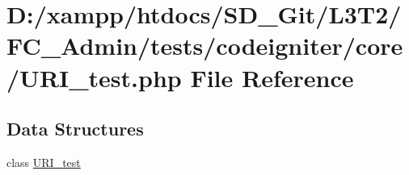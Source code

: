 \hypertarget{_admin_2tests_2codeigniter_2core_2_u_r_i__test_8php}{}\section{D\+:/xampp/htdocs/\+S\+D\+\_\+\+Git/\+L3\+T2/\+F\+C\+\_\+\+Admin/tests/codeigniter/core/\+U\+R\+I\+\_\+test.php File Reference}
\label{_admin_2tests_2codeigniter_2core_2_u_r_i__test_8php}
\subsection*{Data Structures}
\begin{DoxyCompactItemize}
\item 
class \hyperlink{class_u_r_i__test}{U\+R\+I\+\_\+test}
\end{DoxyCompactItemize}
